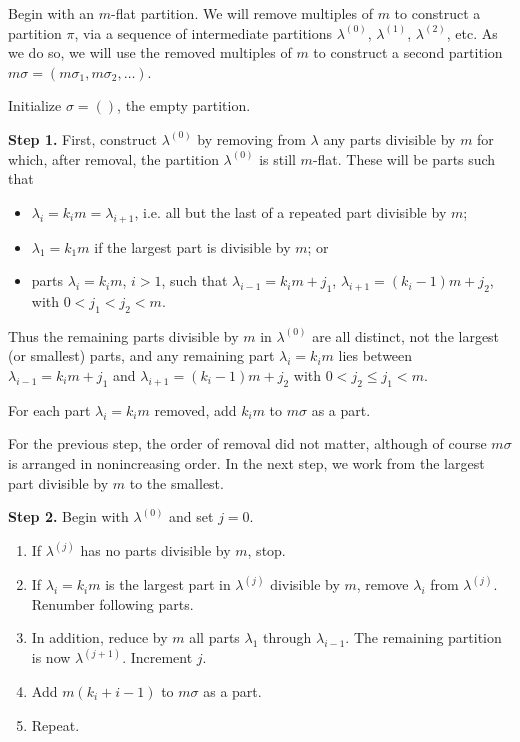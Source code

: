 \documentclass{amsart}
\begin{document}
Begin with an $m$-flat partition.  We will remove multiples of $m$ to construct a partition $\pi$, via a sequence of intermediate partitions $\lambda^{(0)}$, $\lambda^{(1)}$, $\lambda^{(2)}$, etc.  As we do so, we will use the removed multiples of $m$ to construct a second partition $m\sigma = (m\sigma_1,m\sigma_2,\dots)$.

Initialize $\sigma = ()$, the empty partition.  

\textbf{Step 1.} First, construct $\lambda^{(0)}$ by removing from $\lambda$ any parts divisible by $m$ for which, after removal, the partition $\lambda^{(0)}$ is still $m$-flat.  These will be parts such that

\begin{itemize}
\item $\lambda_i = k_i m = \lambda_{i+1}$, i.e. all but the last of a repeated part divisible by $m$; 
\item $\lambda_1 = k_1 m$ if the largest part is divisible by $m$; or
\item parts $\lambda_i = k_i m$, $i>1$, such that $\lambda_{i-1} = k_i m+j_1$, $\lambda_{i+1} = (k_i-1)m + j_2$, with $0 < j_1 < j_2 < m$.
\end{itemize}

Thus the remaining parts divisible by $m$ in $\lambda^{(0)}$ are all distinct, not the largest (or smallest) parts, and any remaining part $\lambda_i = k_i m$ lies between $\lambda_{i-1} = k_i m + j_1$ and $\lambda_{i+1} = (k_i-1)m+j_2$ with $0 < j_2 \leq j_1 < m$.

For each part $\lambda_i = k_i m$ removed, add $k_i m$ to $m\sigma$ as a part.

For the previous step, the order of removal did not matter, although of course $m \sigma$ is arranged in nonincreasing order.  In the next step, we work from the largest part divisible by $m$ to the smallest.

\textbf{Step 2.} Begin with $\lambda^{(0)}$ and set $j=0$.

\begin{enumerate}
\item If $\lambda^{(j)}$ has no parts divisible by $m$, stop.
\item If $\lambda_i = k_i m$ is the largest part in $\lambda^{(j)}$ divisible by $m$, remove $\lambda_i$ from $\lambda^{(j)}$.  Renumber following parts.
\item In addition, reduce by $m$ all parts $\lambda_1$ through $\lambda_{i-1}$.  The remaining partition is now $\lambda^{(j+1)}$.  Increment $j$.
\item Add $m(k_i + i - 1)$ to $m\sigma$ as a part.
\item Repeat.
\end{enumerate} 
\end{document}

